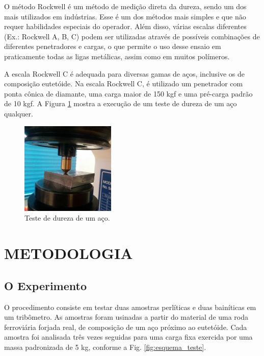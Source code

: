 \documentclass[
12pt,
openany, %
oneside, %
a4paper,			
english,			
brazil			        %
]{abntbibufjf}
\begin{document}
	O método Rockwell é um método de medição direta da dureza, sendo um dos mais utilizados em indústrias. Esse é um dos métodos mais simples e que não requer habilidades especiais do operador. Além disso, várias escalas diferentes (Ex.: Rockwell A, B, C) podem ser utilizadas através de possíveis combinações de diferentes penetradores e cargas, o que permite o uso desse ensaio em praticamente todas as ligas metálicas, assim como em muitos polímeros.
	
	A escala Rockwell C é adequada para diversas gamas de aços, inclusive os de composição eutetóide. Na escala Rockwell C, é utilizado um penetrador com ponta cônica de diamante, uma carga maior de 150 kgf e uma pré-carga padrão de 10 kgf. A Figura \ref{fig:teste_dureza} mostra a execução de um teste de dureza de um aço qualquer.
	
	\begin{figure}[H]
		\centering
		\includegraphics[width=0.4\textwidth]{teste_dureza}
		\caption{Teste de dureza de um aço.}
		\label{fig:teste_dureza}
	\end{figure}

\pagebreak	


	
	
		
	
		
\chapter{METODOLOGIA}
	
\section{O Experimento}

	O procedimento consiste em testar duas amostras perlíticas e duas bainíticas em um tribômetro. As amostras foram usinadas a partir do material de uma roda ferroviária forjada real, de composição de um aço próximo ao eutetóide. Cada amostra foi analisada três vezes seguidas para uma carga fixa exercida por uma massa padronizada de 5 kg, conforme a Fig. \ref{fig:esquema_teste}.
\end{document}
